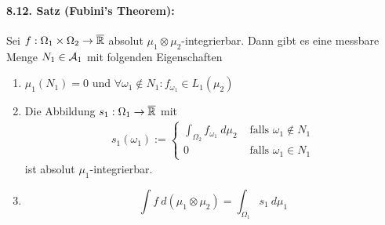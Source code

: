 \documentclass[11pt]{report}
\begin{document}
\paragraph{8.12. Satz (Fubini's Theorem):}Sei $f:\Omega_1\times\Omega_2\to\overline{\mathbb{R}}$ absolut $\mu_1\otimes\mu_2$-integrierbar. Dann gibt es eine messbare Menge $N_1\in\mathcal{A}_1$ mit folgenden Eigenschaften
\begin{enumerate}[label=(\roman*)]
    \item $\mu_1(N_1)=0$ und $\forall\omega_1\notin N_1:f_{\omega_1}\in L_1(\mu_2)$
    \item Die Abbildung $s_1:\Omega_1\to\overline{\mathbb{R}}$ mit
    \begin{align*}
        s_1(\omega_1):=
    \begin{cases}
       \displaystyle \int_{\Omega_2} f_{\omega_1}\ d\mu_2&\text{ falls }\omega_1\notin N_1 \\
       0&\text{ falls }\omega_1\in N_1
    \end{cases}
    \end{align*}
    ist absolut $\mu_1$-integrierbar.
    \item $$\int f\ d(\mu_1\otimes\mu_2)=\int_{\Omega_1}s_1\ d\mu_1$$
\end{enumerate}
\end{document}
